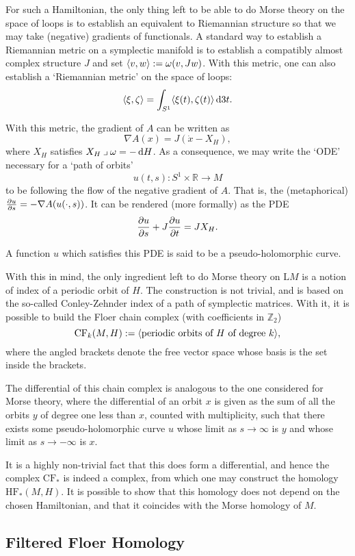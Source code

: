 \documentclass{article}
\theoremstyle{nonumberplain}
\newcommand{\R}{\mathbb{R}}
\newcommand{\Z}{\mathbb{Z}}
\newcommand{\LL}{\mathrm{L}}
\newcommand{\CF}{\mathrm{CF}}
\newcommand{\HF}{\mathrm{HF}}
\newcommand{\grad}{\nabla}
\newcommand{\into}{\mathbin{\lrcorner}}
\DeclarePairedDelimiter{\braket}{\langle}{\rangle}
\begin{document}
For such a Hamiltonian, the only thing left to be able to do Morse theory on the space of loops is to establish an equivalent to Riemannian structure so that we may take (negative) gradients of functionals. A standard way to establish a Riemannian metric on a symplectic manifold is to establish a compatibly almost complex structure $J$ and set $\braket{v,w} := \omega(v, Jw)$. With this metric, one can also establish a `Riemannian metric' on the space of loops:
\[\braket{\xi, \zeta} = \int_{S^1} \braket{\xi(t), \zeta(t)} \dl3t.\]

With this metric, the gradient of $A$ can be written as
\[\grad A(x) = J(\dot x - X_H),\]
where $X_H$ satisfies $X_H \into \omega = - \dl H$. As a consequence, we may write the `ODE' necessary for a `path of orbits'
\[u(t,s) \colon S^1 \times \R \to M\]
to be following the flow of the negative gradient of $A$. That is, the (metaphorical) $\diffp u s = - \grad A(u(\cdot, s))$. It can be rendered (more formally) as the PDE
\[\diffp u s + J \diffp u t = J X_H.\]

A function $u$ which satisfies this PDE is said to be a pseudo-holomorphic curve.

With this in mind, the only ingredient left to do Morse theory on $\LL M$ is a notion of index of a periodic orbit of $H$. The construction is not trivial, and is based on the so-called Conley-Zehnder index of a path of symplectic matrices. With it, it is possible to build the Floer chain complex (with coefficients in $\Z_2$)
\[\CF_k(M, H) := \braket{\text{periodic orbits of $H$ of degree $k$}},\]
where the angled brackets denote the free vector space whose basis is the set inside the brackets.

The differential of this chain complex is analogous to the one considered for Morse theory, where the differential of an orbit $x$ is given as the sum of all the orbits $y$ of degree one less than $x$, counted with multiplicity, such that there exists some pseudo-holomorphic curve $u$ whose limit as $s \to \infty$ is $y$ and whose limit as $s \to -\infty$ is $x$.

It is a highly non-trivial fact that this does form a differential, and hence the complex $\CF_*$ is indeed a complex, from which one may construct the homology $\HF_*(M,H)$. It is possible to show that this homology does not depend on the chosen Hamiltonian, and that it coincides with the Morse homology of $M$.

\subsection{Filtered Floer Homology}
\end{document}
